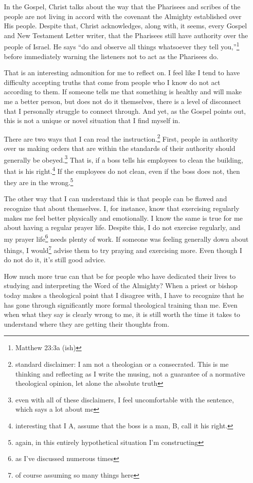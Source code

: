 \documentclass[12pt]{article}[titlepage]
\newcommand{\say}[1]{``#1''}
\newcommand{\1}{\={a}}
\newcommand{\2}{\={e}}
\newcommand{\3}{\={\i}}
\newcommand{\4}{\=o}
\newcommand{\5}{\=u}
\newcommand{\6}{\={A}}
\renewcommand{\,}{\textsuperscript{,}}
\begin{document}
In the Gospel, Christ talks about the way that the Pharisees and scribes of the people are not living in accord with the covenant the Almighty established over His people.
Despite that, Christ acknowledges, along with, it seems, every Gospel and New Testament Letter writer, that the Pharisees still have authority over the people of Israel.
He says \say{do and observe all things whatsoever they tell you,}\footnote{Matthew 23:3a (ish)} before immediately warning the listeners not to act as the Pharisees do.

That is an interesting admonition for me to reflect on.
I feel like I tend to have difficulty accepting truths that come from people who I know do not act according to them.
If someone tells me that something is healthy and will make me a better person, but does not do it themselves, there is a level of disconnect that I personally struggle to connect through.
And yet, as the Gospel points out, this is not a unique or novel situation that I find myself in.

There are two ways that I can read the instruction.\footnote{standard disclaimer: I am not a theologian or a consecrated.
This is me thinking and reflecting as I write the musing, not a guarantee of a normative theological opinion, let alone the absolute truth}
First, people in authority over us making orders that are within the standards of their authority should generally be obeyed.\footnote{even with all of these disclaimers, I feel uncomfortable with the sentence, which says a lot about me}
That is, if a boss tells his employees to clean the building, that is his right.\footnote{interesting that I A, assume that the boss is a man, B, call it his right.}
If the employees do not clean, even if the boss does not, then they are in the wrong.\footnote{again, in this entirely hypothetical situation I'm constructing}

The other way that I can understand this is that people can be flawed and recognize that about themselves.
I, for instance, know that exercising regularly makes me feel better physically and emotionally.
I know the same is true for me about having a regular prayer life.
Despite this, I do not exercise regularly, and my prayer life\footnote{as I've discussed numerous times} needs plenty of work.
If someone was feeling generally down about things, I would\footnote{of course assuming so many things here} advise them to try praying and exercising more.
Even though I do not do it, it's still good advice.

How much more true can that be for people who have dedicated their lives to studying and interpreting the Word of the Almighty?
When a priest or bishop today makes a theological point that I disagree with, I have to recognize that he has gone through significantly more formal theological training than me.
Even when what they say is clearly wrong to me, it is still worth the time it takes to understand where they are getting their thoughts from.
\end{document}
